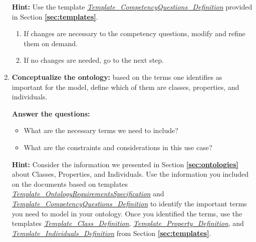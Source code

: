 \documentclass{guideline/sty/rapport}
\begin{document}
\begin{enumerate}
\begin{mdframed}[backgroundcolor=officegreen!8, linecolor=officegreen]
    \begin{minipage}[t]{1\linewidth}
    \textbf{Hint:}
      Use the template 
      \href{https://docs.google.com/spreadsheets/d/1UwT7DnW3pIkDKmfn1jgONsp2BbiQZ4mJeeg0lOBV0DQ/edit#gid=0}{\textit{Template\_CompetencyQuestions\_Definition}} provided in Section \textbf{\ref{sec:templates}}.
    \end{minipage}
\end{mdframed}

\begin{enumerate}
    \item If changes are necessary to the competency questions, modify and refine them on demand.
    \item If no changes are needed, go to the next step.
\end{enumerate}

\item \textcolor{sapphire}{\textbf{Conceptualize the ontology:}}  based on the terms one identifies as important for the model, define which of them are classes, properties, and individuals.  \label{step5}

\textbf{Answer the questions:} 
\begin{itemize}
    \item What are the necessary terms we need to include? 
    \item What are the constraints and considerations in this use case?
\end{itemize}

\begin{mdframed}[backgroundcolor=officegreen!8, linecolor=officegreen]
    \begin{minipage}[t]{1\linewidth}
    \textbf{Hint:}
      Consider the information we presented in Section \textbf{\ref{sec:ontologies}} about Classes, Properties, and Individuals. Use the information you included on the documents based on templates \href{https://docs.google.com/document/d/1mkHccxvvGbj3omXubZ_EbM_l7m8LfalJ/edit}{\textit{Template\_OntologyRequirementsSpecification}} and \href{https://docs.google.com/spreadsheets/d/1UwT7DnW3pIkDKmfn1jgONsp2BbiQZ4mJeeg0lOBV0DQ/edit#gid=0}{\textit{Template\_CompetencyQuestions\_Definition}} to identify the important terms you need to model in your ontology.
      Once you identified the terms, use the templates \href{https://docs.google.com/spreadsheets/d/16g3pAnE-fzbQydI0m5zkswAc83r881oBgKarQaCkGa0/edit#gid=0}{\textit{Template\_Class\_Definition}}, \href{https://docs.google.com/spreadsheets/d/1pmVIaY3WwofKMBwXdqbiCgXH5DL4rNx-ZhKlHUdZoRo/edit#gid=0}{\textit{Template\_Property\_Definition}}, and \href{https://docs.google.com/spreadsheets/d/11_twMjg6mwAQoefg4pRDqZCcsNCKwbrflg0NIkcyF1I/edit#gid=0}{\textit{Template\_Individuals\_Definition}} from Section \textbf{\ref{sec:templates}}.
    \end{minipage}
\end{mdframed}


\end{enumerate}
\end{document}
